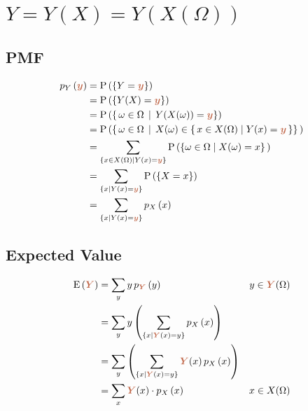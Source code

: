 \documentclass{article}
\DeclareRobustCommand{\myRandV}[1]{#1} %
\newcommand{\myPMF}[2]{p_{#1}\left(#2\right)}
\newcommand{\myP}[1]{\operatorname{P}\left(#1\right)} %
\newcommand{\myExpect}[1]{\operatorname{E}\left(#1\right)} %
\newcommand{\myParam}[1]{\textcolor{myParamColor}{\bm{#1}}}
\begin{document}
\newpage

\section{$Y = Y(X) = Y(X(\Omega))$}
\subsection{PMF}

\begin{equation*}
\begin{aligned}
    \myPMF{\myRandV{Y}}{\myParam{y}} &= \myP{\{\myRandV{Y} = \myParam{y}\}} \\
    &= \myP{\left\{\myRandV{Y}(\myRandV{X}) = \myParam{y}\right\}} \\
    &= \myP{\left\{\, \omega \in \Omega \, \mid \, \myRandV{Y}(\myRandV{X}(\omega)) = \myParam{y}\right\}} \\
    &= \myP{\left\{\, \omega \in \Omega \, \mid \, \myRandV{X}(\omega) \in \{\, x \in \myRandV{X}(\Omega) \mid \myRandV{Y}(x) = \myParam{y} \,\}\right\} \,} \\
    &= \sum_{\left\{x \in \myRandV{X}(\Omega) \mid \myRandV{Y}(x) = \myParam{y}\right\}} \myP{\left\{\omega \in \Omega \mid \myRandV{X}(\omega) = x\right\} \,} \\
    &= \sum_{\left\{x \mid \myRandV{Y}(x) = \myParam{y}\right\}} \myP{\{\myRandV{X} = x\}} \\
    &= \sum_{\left\{x \mid \myRandV{Y}(x) = \myParam{y}\right\}} \myPMF{\myRandV{X}}{x} \\
\end{aligned}
\end{equation*}

\subsection{Expected Value}

\begin{equation*}
\begin{aligned}
    \myExpect{\myParam{\myRandV{Y}}} &= \sum_{y} y \, \myPMF{\myParam{\myRandV{Y}}}{y} & y \in \myParam{\myRandV{Y}}(\Omega) \\
    &= \sum_{y} y \left(\sum_{\{x \mid \myParam{\myRandV{Y}}(x) = y\}} \myPMF{\myRandV{X}}{x}\right) \\
    &= \sum_{y} \left(\sum_{\{x \mid \myParam{\myRandV{Y}}(x) = y\}} \myParam{\myRandV{Y}}(x) \, \myPMF{\myRandV{X}}{x}\right) \\
    &= \sum_{x} \myParam{\myRandV{Y}}(x) \cdot \myPMF{X}{x} & x \in \myRandV{X}(\Omega) \\
\end{aligned}
\end{equation*}
\end{document}
